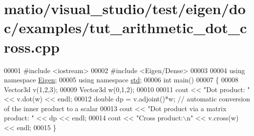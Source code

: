 \hypertarget{matio_2visual__studio_2test_2eigen_2doc_2examples_2tut__arithmetic__dot__cross_8cpp_source}{}\section{matio/visual\+\_\+studio/test/eigen/doc/examples/tut\+\_\+arithmetic\+\_\+dot\+\_\+cross.cpp}
\label{matio_2visual__studio_2test_2eigen_2doc_2examples_2tut__arithmetic__dot__cross_8cpp_source}

\begin{DoxyCode}
00001 \textcolor{preprocessor}{#include <iostream>}
00002 \textcolor{preprocessor}{#include <Eigen/Dense>}
00003 
00004 \textcolor{keyword}{using namespace }\hyperlink{namespace_eigen}{Eigen};
00005 \textcolor{keyword}{using namespace }\hyperlink{namespacestd}{std};
00006 \textcolor{keywordtype}{int} main()
00007 \{
00008   Vector3d v(1,2,3);
00009   Vector3d w(0,1,2);
00010 
00011   cout << \textcolor{stringliteral}{"Dot product: "} << v.dot(w) << endl;
00012   \textcolor{keywordtype}{double} dp = v.adjoint()*w; \textcolor{comment}{// automatic conversion of the inner product to a scalar}
00013   cout << \textcolor{stringliteral}{"Dot product via a matrix product: "} << dp << endl;
00014   cout << \textcolor{stringliteral}{"Cross product:\(\backslash\)n"} << v.cross(w) << endl;
00015 \}
\end{DoxyCode}
